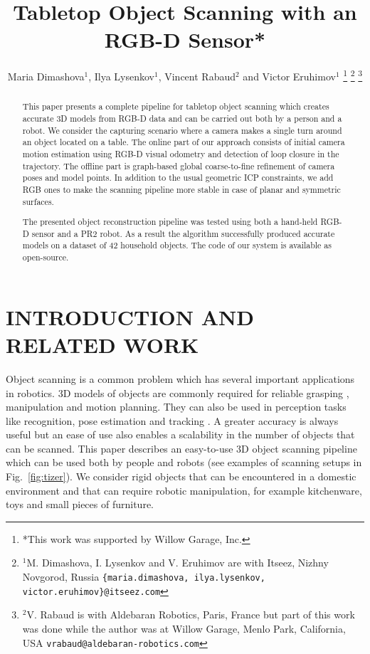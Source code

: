 \documentclass[letterpaper, 10 pt, conference]{ieeeconf}  %
\title{\LARGE \bf
Tabletop Object Scanning with an RGB-D Sensor*
}
\author{Maria Dimashova$^{1}$, Ilya Lysenkov$^{1}$, Vincent Rabaud$^{2}$ and Victor Eruhimov$^{1}$
\thanks{*This work was supported by Willow Garage, Inc.}%
\thanks{$^{1}$M. Dimashova, I. Lysenkov and V. Eruhimov are with Itseez, Nizhny Novgorod, Russia
        {\tt\small \{maria.dimashova, ilya.lysenkov, victor.eruhimov\}@itseez.com}}%
\thanks{$^{2}$V. Rabaud is with Aldebaran Robotics, Paris, France but part of this work was done while the author was 
at Willow Garage, Menlo Park, California, USA {\tt\small vrabaud@aldebaran-robotics.com}}%
}
\begin{document}
\maketitle
\thispagestyle{empty}
\pagestyle{empty}


\begin{abstract}
This paper presents a complete pipeline for tabletop object scanning
which creates accurate 3D models from RGB-D data and can be carried out both by a person
and a robot. We consider the capturing scenario where a camera makes
a single turn around an object located on a table. The online part of our approach consists 
of initial camera motion estimation using RGB-D visual
odometry and detection of loop closure in the trajectory. The offline part
is graph-based global coarse-to-fine refinement of camera poses and model points.
In addition to the usual geometric ICP constraints, we add
RGB ones to make the scanning pipeline more stable in case 
of planar and symmetric surfaces. 

The presented object reconstruction pipeline was tested using both a hand-held RGB-D sensor and a PR2 robot.
As a result the algorithm successfully produced accurate models on a dataset of 42 household objects.
The code of our system is available as open-source.

\end{abstract}


\section{INTRODUCTION AND RELATED WORK}

Object scanning is a common problem which has several important applications in robotics.
3D models of objects are commonly required for reliable grasping \cite{miller2004graspit, sahbani2012overview},
manipulation and motion planning. They can also be used in perception tasks like recognition, pose estimation and 
tracking \cite{klank2009real, hinterstoisser2012accv}.
A greater accuracy is always useful but an ease of use also enables a scalability
in the number of objects that can be scanned.
This paper describes an easy-to-use 3D object scanning pipeline
which can be used both by people and robots (see 
examples of scanning setups in Fig.~\ref{fig:tizer}).
We consider rigid objects that can be encountered
in a domestic environment and that can require robotic manipulation, for example
kitchenware, toys and small pieces of furniture.
\end{document}
